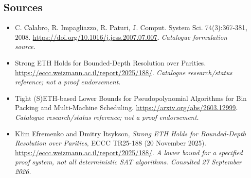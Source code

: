 \documentclass[11pt,a4paper]{article}
\numberwithin{equation}{section}
\begin{document}
\subsection{Sources}
\begin{itemize}\raggedright
\item[\textnormal{[S1]}]\hypertarget{source:statement:1}{} C. Calabro, R. Impagliazzo, R. Paturi, J. Comput. System Sci. 74(3):367-381, 2008.
\url{https://doi.org/10.1016/j.jcss.2007.07.007}.
{\small\textit{Catalogue formulation source.}}
\item[\textnormal{[S2]}]\hypertarget{source:statement:2}{} Strong ETH Holds for Bounded-Depth Resolution over Parities.
\url{https://eccc.weizmann.ac.il/report/2025/188/}.
{\small\textit{Catalogue research/status reference; not a proof endorsement.}}
\item[\textnormal{[S3]}]\hypertarget{source:statement:3}{} Tight (S)ETH-based Lower Bounds for Pseudopolynomial Algorithms for Bin Packing and Multi-Machine Scheduling.
\url{https://arxiv.org/abs/2603.12999}.
{\small\textit{Catalogue research/status reference; not a proof endorsement.}}

\item[\textnormal{[E1]}]\hypertarget{extra:statement:1}{} Klim Efremenko and Dmitry Itsykson, \emph{Strong ETH Holds for Bounded-Depth Resolution over Parities}, ECCC TR25-188 (20 November 2025).
\url{https://eccc.weizmann.ac.il/report/2025/188/}.
{\small\textit{A lower bound for a specified proof system, not all deterministic SAT algorithms. Consulted 27 September 2026.}}
\end{itemize}
\end{document}
